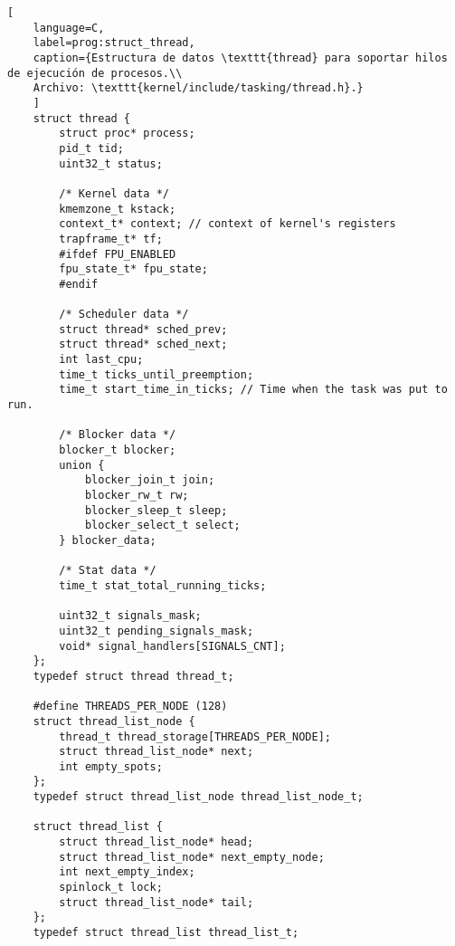 \begin{lstlisting}[
	language=C,
	label=prog:struct_thread,
	caption={Estructura de datos \texttt{thread} para soportar hilos de ejecución de procesos.\\
	Archivo: \texttt{kernel/include/tasking/thread.h}.}
	]
	struct thread {
		struct proc* process;
		pid_t tid;
		uint32_t status;
		
		/* Kernel data */
		kmemzone_t kstack;
		context_t* context; // context of kernel's registers
		trapframe_t* tf;
		#ifdef FPU_ENABLED
		fpu_state_t* fpu_state;
		#endif
		
		/* Scheduler data */
		struct thread* sched_prev;
		struct thread* sched_next;
		int last_cpu;
		time_t ticks_until_preemption;
		time_t start_time_in_ticks; // Time when the task was put to run.
		
		/* Blocker data */
		blocker_t blocker;
		union {
			blocker_join_t join;
			blocker_rw_t rw;
			blocker_sleep_t sleep;
			blocker_select_t select;
		} blocker_data;
		
		/* Stat data */
		time_t stat_total_running_ticks;
		
		uint32_t signals_mask;
		uint32_t pending_signals_mask;
		void* signal_handlers[SIGNALS_CNT];
	};
	typedef struct thread thread_t;
	
	#define THREADS_PER_NODE (128)
	struct thread_list_node {
		thread_t thread_storage[THREADS_PER_NODE];
		struct thread_list_node* next;
		int empty_spots;
	};
	typedef struct thread_list_node thread_list_node_t;
	
	struct thread_list {
		struct thread_list_node* head;
		struct thread_list_node* next_empty_node;
		int next_empty_index;
		spinlock_t lock;
		struct thread_list_node* tail;
	};
	typedef struct thread_list thread_list_t;
\end{lstlisting}

